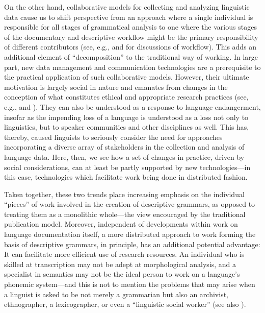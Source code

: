 \documentclass[12pt]{article}
\newcommand\namecite{\citet}
\renewcommand\cite{\citep}
\begin{document}
On the other hand, collaborative models for collecting and analyzing linguistic
data cause us to shift perspective from an approach where a single individual is
responsible for all stages of grammatical analysis to one where the various
stages of the documentary and descriptive workflow might be the primary
responsibility of different contributors (see, e.g., \namecite{Thieberger:2004}
and \namecite[461--462]{Bowern:2011} for discussions of workflow). This adds an
additional element of ``decomposition'' to the traditional way of working. In
large part, new data management and communication technologies are a
prerequisite to the practical application of such collaborative models. However,
their ultimate motivation is largely social in nature and emanates from changes
in the conception of what constitutes ethical and appropriate research practices
(see, e.g., \namecite[124--134]{Rice:2006} and
\namecite[201--206]{DobrinBerson:2011}). They can also be understood as a
response to language endangerment, insofar as the impending loss of a language
is understood as a loss not only to linguistics, but to speaker communities and
other disciplines as well. This has, thereby, caused linguists to seriously
consider the need for approaches incorporating a diverse array of stakeholders
in the collection and analysis of language data. Here, then, we see how a set of
changes in practice, driven by social considerations, can at least be partly
supported by new technologies---in this case, technologies which facilitate work
being done in distributed fashion.

Taken together, these two trends place increasing emphasis on the individual
``pieces'' of work involved in the creation of descriptive grammars, as opposed
to treating them as a monolithic whole---the view encouraged by the traditional
publication model. Moreover, independent of developments within work on language
documentation itself, a more distributed approach to work forming the basis of
descriptive grammars, in principle, has an additional potential advantage: It
can facilitate more efficient use of research resources. An individual who is
skilled at transcription may not be adept at morphological analysis, and a
specialist in semantics may not be the ideal person to work on a language's
phonemic system---and this is not to mention the problems that may arise when a
linguist is asked to be not merely a grammarian but also an archivist,
ethnographer, a lexicographer, or even a ``linguistic social worker''
\cite[14--17]{Newman:1998} (see also \namecite[342--343]{Evans:2008}).
\end{document}
